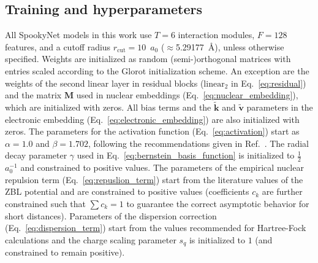 \documentclass[%
superscriptaddress,
reprint,
nofootinbib,
amsmath,amssymb,amsfonts,
floatfix,
altaffilletter,
showkeys,
]{revtex4-2}
\newcommand{\nn}{SpookyNet}
\begin{document}
\subsection*{Training and hyperparameters}
All \nn{} models in this work use $T=6$ interaction modules, $F=128$ features, and a cutoff radius $r_\mathrm{cut} = 10$~$a_0$ ($\approx$5.29177~\AA), unless otherwise specified. Weights are initialized as random (semi\nobreakdash-)orthogonal matrices with entries scaled according to the Glorot initialization scheme.\cite{glorot2010understanding}
An exception are the weights of the second linear layer in residual blocks ($\mathrm{linear}_2$ in Eq.~\ref{eq:residual}) and the matrix $\mathbf{M}$ used in nuclear embeddings (Eq.~\ref{eq:nuclear_embedding}), which are initialized with zeros. All bias terms and the $\mathbf{\tilde{k}}$ and $\mathbf{\tilde{v}}$ parameters in the electronic embedding (Eq.~\ref{eq:electronic_embedding}) are also initialized with zeros. The parameters for the activation function (Eq.~\ref{eq:activation}) start as $\alpha = 1.0$ and $\beta=1.702$, following the recommendations given in Ref.~. The radial decay parameter $\gamma$ used in Eq.~\ref{eq:bernstein_basis_function} is initialized to $\frac{1}{2}$~$a_0^{-1}$ and constrained to positive values. The parameters of the empirical nuclear repulsion term (Eq.~\ref{eq:repuslion_term}) start from the literature values of the ZBL potential\cite{ziegler1985stopping} and are constrained to positive values (coefficients $c_k$ are further constrained such that $\sum c_k = 1$ to guarantee the correct asymptotic behavior for short distances). Parameters of the dispersion correction (Eq.~\ref{eq:dispersion_term}) start from the values recommended for Hartree-Fock calculations\cite{caldeweyher2019generally} and the charge scaling parameter $s_q$ is initialized to $1$ (and constrained to remain positive).
\end{document}
